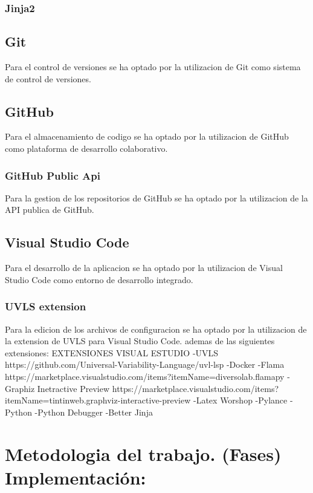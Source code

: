 \documentclass[12pt, a4paper, twoside]{article}
\begin{document}
\subsubsection{Jinja2}


\subsection{Git}
Para el control de versiones se ha optado por la utilizacion de Git como sistema de control de versiones.
\subsection{GitHub}
Para el almacenamiento de codigo se ha optado por la utilizacion de GitHub como plataforma de desarrollo colaborativo.
\subsubsection{GitHub Public Api}
Para la gestion de los repositorios de GitHub se ha optado por la utilizacion de la API publica de GitHub.
\blindtext

\subsection{Visual Studio Code}
Para el desarrollo de la aplicacion se ha optado por la utilizacion de Visual Studio Code como entorno de desarrollo integrado.
\subsubsection{UVLS extension}
Para la edicion de los archivos de configuracion se ha optado por la utilizacion de la extension de UVLS para Visual Studio Code.
ademas de las siguientes extensiones:
EXTENSIONES VISUAL ESTUDIO
	-UVLS https://github.com/Universal-Variability-Language/uvl-lsp
	-Docker
	-Flama https://marketplace.visualstudio.com/items?itemName=diversolab.flamapy
	-Graphiz Inetractive Preview https://marketplace.visualstudio.com/items?itemName=tintinweb.graphviz-interactive-preview
	-Latex Worshop
	-Pylance
	-Python
	-Python Debugger
	-Better Jinja






\section{Metodologia del trabajo. (Fases) Implementación:}
\end{document}
